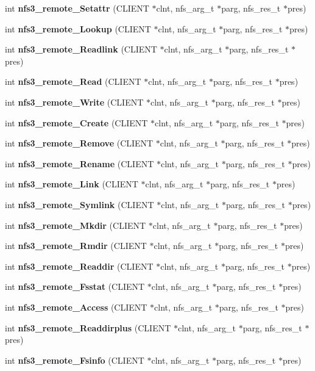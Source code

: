 \begin{CompactItemize}
\item 
int {\bf nfs3\_\-remote\_\-Setattr} (CLIENT $\ast$clnt, nfs\_\-arg\_\-t $\ast$parg, nfs\_\-res\_\-t $\ast$pres)
\item 
int {\bf nfs3\_\-remote\_\-Lookup} (CLIENT $\ast$clnt, nfs\_\-arg\_\-t $\ast$parg, nfs\_\-res\_\-t $\ast$pres)
\item 
int {\bf nfs3\_\-remote\_\-Readlink} (CLIENT $\ast$clnt, nfs\_\-arg\_\-t $\ast$parg, nfs\_\-res\_\-t $\ast$pres)
\item 
int {\bf nfs3\_\-remote\_\-Read} (CLIENT $\ast$clnt, nfs\_\-arg\_\-t $\ast$parg, nfs\_\-res\_\-t $\ast$pres)
\item 
int {\bf nfs3\_\-remote\_\-Write} (CLIENT $\ast$clnt, nfs\_\-arg\_\-t $\ast$parg, nfs\_\-res\_\-t $\ast$pres)
\item 
int {\bf nfs3\_\-remote\_\-Create} (CLIENT $\ast$clnt, nfs\_\-arg\_\-t $\ast$parg, nfs\_\-res\_\-t $\ast$pres)
\item 
int {\bf nfs3\_\-remote\_\-Remove} (CLIENT $\ast$clnt, nfs\_\-arg\_\-t $\ast$parg, nfs\_\-res\_\-t $\ast$pres)
\item 
int {\bf nfs3\_\-remote\_\-Rename} (CLIENT $\ast$clnt, nfs\_\-arg\_\-t $\ast$parg, nfs\_\-res\_\-t $\ast$pres)
\item 
int {\bf nfs3\_\-remote\_\-Link} (CLIENT $\ast$clnt, nfs\_\-arg\_\-t $\ast$parg, nfs\_\-res\_\-t $\ast$pres)
\item 
int {\bf nfs3\_\-remote\_\-Symlink} (CLIENT $\ast$clnt, nfs\_\-arg\_\-t $\ast$parg, nfs\_\-res\_\-t $\ast$pres)
\item 
int {\bf nfs3\_\-remote\_\-Mkdir} (CLIENT $\ast$clnt, nfs\_\-arg\_\-t $\ast$parg, nfs\_\-res\_\-t $\ast$pres)
\item 
int {\bf nfs3\_\-remote\_\-Rmdir} (CLIENT $\ast$clnt, nfs\_\-arg\_\-t $\ast$parg, nfs\_\-res\_\-t $\ast$pres)
\item 
int {\bf nfs3\_\-remote\_\-Readdir} (CLIENT $\ast$clnt, nfs\_\-arg\_\-t $\ast$parg, nfs\_\-res\_\-t $\ast$pres)
\item 
int {\bf nfs3\_\-remote\_\-Fsstat} (CLIENT $\ast$clnt, nfs\_\-arg\_\-t $\ast$parg, nfs\_\-res\_\-t $\ast$pres)
\item 
int {\bf nfs3\_\-remote\_\-Access} (CLIENT $\ast$clnt, nfs\_\-arg\_\-t $\ast$parg, nfs\_\-res\_\-t $\ast$pres)
\item 
int {\bf nfs3\_\-remote\_\-Readdirplus} (CLIENT $\ast$clnt, nfs\_\-arg\_\-t $\ast$parg, nfs\_\-res\_\-t $\ast$pres)
\item 
int {\bf nfs3\_\-remote\_\-Fsinfo} (CLIENT $\ast$clnt, nfs\_\-arg\_\-t $\ast$parg, nfs\_\-res\_\-t $\ast$pres)

\end{CompactItemize}

